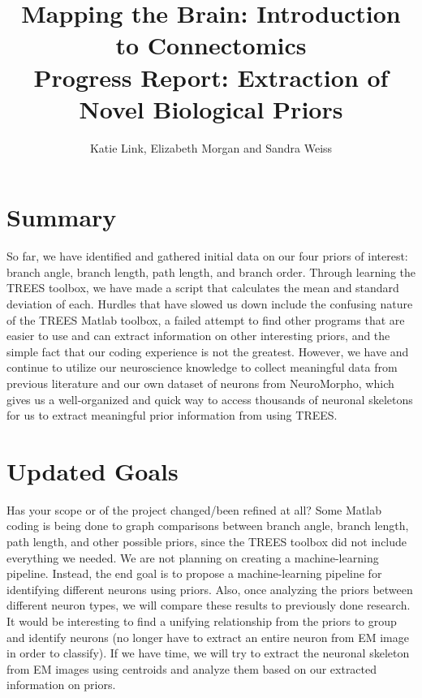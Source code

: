 \documentclass[11pt]{article} %
\title{Mapping the Brain: Introduction to Connectomics\\Progress Report: Extraction of Novel Biological Priors}
\author{Katie Link, Elizabeth Morgan and Sandra Weiss}
\begin{document}
\maketitle

\section{Summary}

So far, we have identified and gathered initial data on our four priors of interest: branch angle, branch length, path length, and branch order. Through learning the TREES toolbox, we have made a script that calculates the mean and standard deviation of each. Hurdles that have slowed us down include the confusing nature of the TREES Matlab toolbox, a failed attempt to find other programs that are easier to use and can extract information on other interesting priors, and the simple fact that our coding experience is not the greatest. However, we have and continue to utilize our neuroscience knowledge to collect meaningful data from previous literature and our own dataset of neurons from NeuroMorpho, which gives us a well-organized and quick way to access thousands of neuronal skeletons for us to extract meaningful prior information from using TREES.

\section{Updated Goals}
Has your scope or of the project changed/been refined at all?
Some Matlab coding is being done to graph comparisons between branch angle, branch length, path length, and other possible priors, since the TREES toolbox did not include everything we needed. We are not planning on creating a machine-learning pipeline. Instead, the end goal is to propose a machine-learning pipeline for identifying different neurons using priors. Also, once analyzing the priors between different neuron types, we will compare these results to previously done research. It would be interesting to find a unifying relationship from the priors to group and identify neurons (no longer have to extract an entire neuron from EM image in order to classify). If we have time, we will try to extract the neuronal skeleton from EM images using centroids and analyze them based on our extracted information on priors.\\
\end{document}
